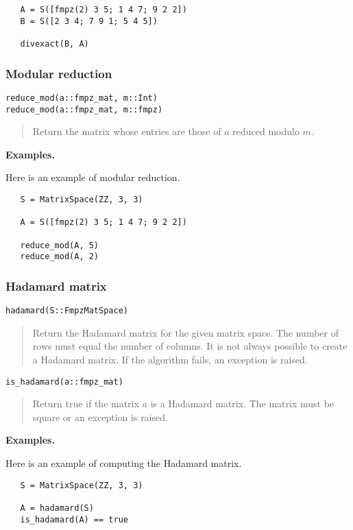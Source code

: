 \documentclass[a4paper,10pt]{article}
\newcommand{\desc}[1]{\vspace{-3mm}\begin{quote}#1\end{quote}}
\begin{document}
{{\begin{lstlisting}
   A = S([fmpz(2) 3 5; 1 4 7; 9 2 2])
   B = S([2 3 4; 7 9 1; 5 4 5])
 
   divexact(B, A)
\end{lstlisting}

\subsubsection{Modular reduction}

\begin{lstlisting}
reduce_mod(a::fmpz_mat, m::Int)
reduce_mod(a::fmpz_mat, m::fmpz)
\end{lstlisting}

\desc{Return the matrix whose entries are those of $a$ reduced modulo $m$.}

\textbf{Examples.}

Here is an example of modular reduction.

\begin{lstlisting}
   S = MatrixSpace(ZZ, 3, 3)

   A = S([fmpz(2) 3 5; 1 4 7; 9 2 2])
   
   reduce_mod(A, 5)
   reduce_mod(A, 2)
\end{lstlisting}

\subsubsection{Hadamard matrix}

\begin{lstlisting}
hadamard(S::FmpzMatSpace)
\end{lstlisting}

\desc{Return the Hadamard matrix for the given matrix space. The number of rows must
equal the number of columns. It is not always possible to create a Hadamard matrix.
If the algorithm fails, an exception is raised.}

\begin{lstlisting}
is_hadamard(a::fmpz_mat)
\end{lstlisting}

\desc{Return true if the matrix $a$ is a Hadamard matrix. The matrix must be square
or an exception is raised.}

\textbf{Examples.}

Here is an example of computing the Hadamard matrix.

\begin{lstlisting}
   S = MatrixSpace(ZZ, 3, 3)

   A = hadamard(S)
   is_hadamard(A) == true
\end{lstlisting}

}}
\end{document}
